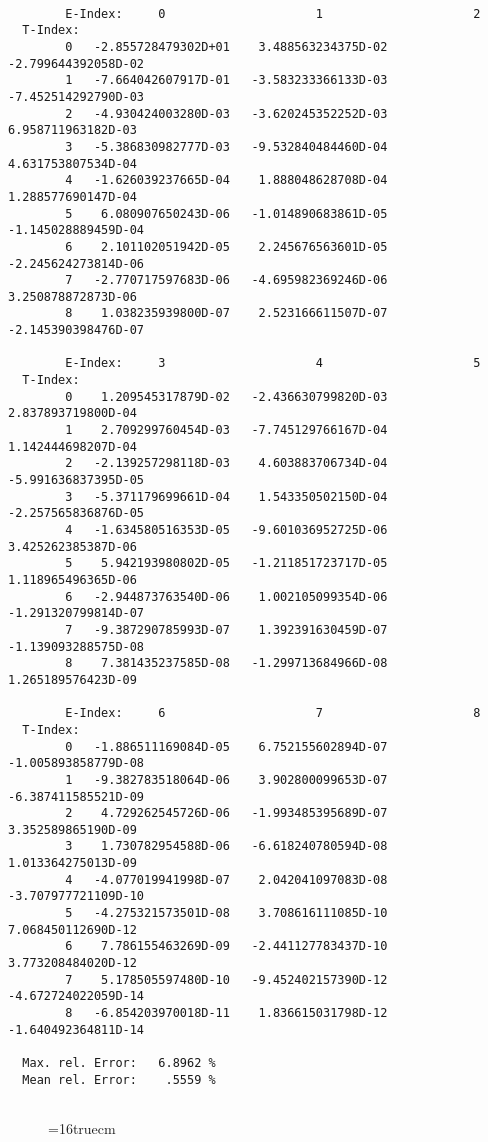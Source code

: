 \documentclass[12pt]{article}
\begin{document}
\begin{small}\begin{verbatim}

        E-Index:     0                     1                     2
  T-Index:
        0   -2.855728479302D+01    3.488563234375D-02   -2.799644392058D-02
        1   -7.664042607917D-01   -3.583233366133D-03   -7.452514292790D-03
        2   -4.930424003280D-03   -3.620245352252D-03    6.958711963182D-03
        3   -5.386830982777D-03   -9.532840484460D-04    4.631753807534D-04
        4   -1.626039237665D-04    1.888048628708D-04    1.288577690147D-04
        5    6.080907650243D-06   -1.014890683861D-05   -1.145028889459D-04
        6    2.101102051942D-05    2.245676563601D-05   -2.245624273814D-06
        7   -2.770717597683D-06   -4.695982369246D-06    3.250878872873D-06
        8    1.038235939800D-07    2.523166611507D-07   -2.145390398476D-07

        E-Index:     3                     4                     5
  T-Index:
        0    1.209545317879D-02   -2.436630799820D-03    2.837893719800D-04
        1    2.709299760454D-03   -7.745129766167D-04    1.142444698207D-04
        2   -2.139257298118D-03    4.603883706734D-04   -5.991636837395D-05
        3   -5.371179699661D-04    1.543350502150D-04   -2.257565836876D-05
        4   -1.634580516353D-05   -9.601036952725D-06    3.425262385387D-06
        5    5.942193980802D-05   -1.211851723717D-05    1.118965496365D-06
        6   -2.944873763540D-06    1.002105099354D-06   -1.291320799814D-07
        7   -9.387290785993D-07    1.392391630459D-07   -1.139093288575D-08
        8    7.381435237585D-08   -1.299713684966D-08    1.265189576423D-09

        E-Index:     6                     7                     8
  T-Index:
        0   -1.886511169084D-05    6.752155602894D-07   -1.005893858779D-08
        1   -9.382783518064D-06    3.902800099653D-07   -6.387411585521D-09
        2    4.729262545726D-06   -1.993485395689D-07    3.352589865190D-09
        3    1.730782954588D-06   -6.618240780594D-08    1.013364275013D-09
        4   -4.077019941998D-07    2.042041097083D-08   -3.707977721109D-10
        5   -4.275321573501D-08    3.708616111085D-10    7.068450112690D-12
        6    7.786155463269D-09   -2.441127783437D-10    3.773208484020D-12
        7    5.178505597480D-10   -9.452402157390D-12   -4.672724022059D-14
        8   -6.854203970018D-11    1.836615031798D-12   -1.640492364811D-14

  Max. rel. Error:   6.8962 %
  Mean rel. Error:    .5559 %


\end{verbatim}\end{small}
\begin{figure} \label{2.1.8}
\epsfxsize=16truecm
\end{figure}
\newpage
\end{document}
